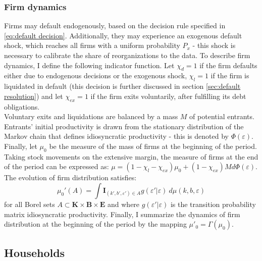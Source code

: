 \documentclass[12pt]{article}
\begin{document}
\subsubsection{Firm dynamics}
Firms may default endogenously, based on the decision rule specified in \ref{eq:default decision}. Additionally, they may experience an exogenous default shock, which reaches all firms with a uniform probability $P_{x}$ - this shock is necessary to calibrate the share of reorganizations to the data. To describe firm dynamics, I define the following indicator function. Let $\chi_{d} = 1$ if the firm defaults either due to endogenous decisions or the exogenous shock, $\chi_l = 1$ if the firm is liquidated in default (this decision is further discussed in section \ref{sec:default resolution})  and let $\chi_{ex} = 1$ if the firm exits voluntarily, after fulfilling its debt obligations. \vspace{3mm} \\
Voluntary exits and liquidations are balanced by a mass $M$ of potential entrants. Entrants' initial productivity is drawn from the stationary distribution of the Markov chain that defines idiosyncratic productivity - this is denoted by $\Phi(\varepsilon)$. Finally, let $\mu_0$ be the measure of the mass of firms at the beginning of the period. Taking stock movements on the extensive margin, the measure of firms at the end of the period can be expressed as: $\mu = (1 - \chi_l - \chi_{ex}) \mu_0  + (1 - \chi_{ex}) M d \Phi(\varepsilon) $. \vspace{3mm} \\
The evolution of firm distribution satisfies: 
\begin{equation} \label{eq_firmdim} 
    \mu_{0}'(A) = \int \mathbf{I}_{(k', b', \varepsilon') \in A} g(\varepsilon'|\varepsilon) \ d \mu (k,b,\varepsilon)
\end{equation}
for all Borel sets $A \subset  \mathbf{K} \times \mathbf{B} \times \mathbf{E} $ and where $g(\varepsilon'|\varepsilon)$ is the transition probability matrix idiosyncratic productivity. Finally, I summarize the dynamics of firm distribution at the beginning of the period by the mapping $ \mu'_0 =\Gamma(\mu_0)$.


\subsection{Households}\label{sec:hh}
\end{document}
